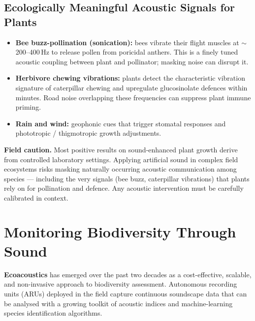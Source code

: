 \documentclass[12pt, a4paper]{article}
\begin{document}
\subsection{Ecologically Meaningful Acoustic Signals for Plants}

\begin{itemize}[itemsep=4pt]
  \item \textbf{Bee buzz-pollination (sonication):} bees vibrate their flight muscles at
        $\sim$200--400\,Hz to release pollen from poricidal anthers. This is a finely tuned
        acoustic coupling between plant and pollinator; masking noise can disrupt it.

  \item \textbf{Herbivore chewing vibrations:} plants detect the characteristic vibration
        signature of caterpillar chewing and upregulate glucosinolate defences within minutes.
        Road noise overlapping these frequencies can suppress plant immune priming.

  \item \textbf{Rain and wind:} geophonic cues that trigger stomatal responses and
        phototropic / thigmotropic growth adjustments.
\end{itemize}

\begin{warnbox}
\textbf{Field caution.} Most positive results on sound-enhanced plant growth derive from
controlled laboratory settings. Applying artificial sound in complex field ecosystems risks
masking naturally occurring acoustic communication among species --- including the very signals
(bee buzz, caterpillar vibrations) that plants rely on for pollination and defence.
Any acoustic intervention must be carefully calibrated in context.
\end{warnbox}

\newpage

\section{Monitoring Biodiversity Through Sound}

\textbf{Ecoacoustics} has emerged over the past two decades as a cost-effective, scalable,
and non-invasive approach to biodiversity assessment. Autonomous recording units (ARUs) deployed
in the field capture continuous soundscape data that can be analysed with a growing toolkit
of acoustic indices and machine-learning species identification algorithms.
\end{document}
